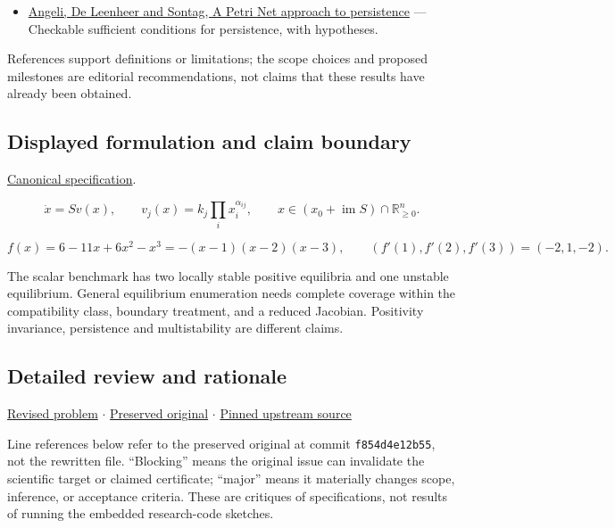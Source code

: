 \documentclass[
  11pt,
]{article}
\providecommand{\tightlist}{%
  \setlength{\itemsep}{0pt}\setlength{\parskip}{0pt}}
\begin{document}
\begin{itemize}
\tightlist
\item
  \href{https://arxiv.org/abs/q-bio/0608019}{Angeli, De Leenheer and
  Sontag, A Petri Net approach to persistence} --- Checkable sufficient
  conditions for persistence, with hypotheses.
\end{itemize}

References support definitions or limitations; the scope choices and
proposed milestones are editorial recommendations, not claims that these
results have already been obtained.

\subsection{Displayed formulation and claim boundary}

\href{https://github.com/rick-stevens-ai/Pure-Thought/blob/main/PRDs/19-Chemical-Reaction-Networks.md}{Canonical
specification}.

\[\dot x=S v(x),\qquad v_j(x)=k_j\prod_i x_i^{\alpha_{ij}},\qquad
x\in(x_0+\operatorname{im}S)\cap\mathbb R_{\ge0}^n.\]

\[f(x)=6-11x+6x^2-x^3=-(x-1)(x-2)(x-3),
\qquad (f'(1),f'(2),f'(3))=(-2,1,-2).\]

The scalar benchmark has two locally stable positive equilibria and one
unstable equilibrium. General equilibrium enumeration needs complete
coverage within the compatibility class, boundary treatment, and a
reduced Jacobian. Positivity invariance, persistence and multistability
are different claims.

\subsection{Detailed review and rationale}

\href{https://github.com/rick-stevens-ai/Pure-Thought/blob/main/PRDs/19-Chemical-Reaction-Networks.md}{Revised
problem} \ensuremath{\cdot}
\href{https://github.com/rick-stevens-ai/Pure-Thought/blob/main/archive/original-PRDs/19-Chemical-Reaction-Networks.md}{Preserved
original} \ensuremath{\cdot}
\href{https://github.com/rick-stevens-ai/Pure-Thought/blob/f854d4e12b55c1f5b5c2a964b75f2d23496d981e/PRDs/19-Chemical-Reaction-Networks.md}{Pinned
upstream source}

Line references below refer to the preserved original at commit
\texttt{f854d4e12b55}, not the rewritten file. ``Blocking'' means the
original issue can invalidate the scientific target or claimed
certificate; ``major'' means it materially changes scope, inference, or
acceptance criteria. These are critiques of specifications, not results
of running the embedded research-code sketches.
\end{document}
